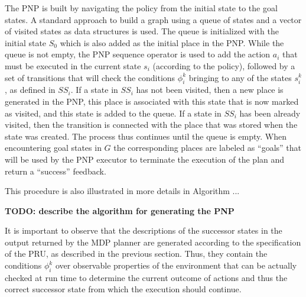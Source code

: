 The PNP is built by navigating the policy from the initial state to the goal states.
A standard approach to build a graph using a queue of states and a vector of visited states as data structures is used.
The queue is initialized with the initial state $S_0$ which is also added as the initial place in the PNP.
While the queue is not empty, the PNP sequence operator is used to add the action $a_i$ that must be executed in the current state $s_i$ (according to the policy), followed by a set of transitions that will check the conditions $\phi_i^k$ bringing to any of the states $s_i^k$, as defined in $SS_i$. 
If a state in $SS_i$ has not been visited, then a new place is generated in the PNP, this place is associated with this state that is now marked as visited, and this state is added to the queue. If a state in $SS_i$ has been already visited, then the transition is connected with the place that was stored when the state was created. The process thus continues until the queue is empty.
When encountering goal states in $G$ the corresponding places are labeled as ``goals'' that will be used by the PNP executor to terminate the execution of the plan and return a ``success'' feedback.


This procedure is also illustrated in more details in Algorithm ... 

{\bf TODO: describe the algorithm for generating the PNP}

It is important to observe that the descriptions of the successor states in the output returned by the MDP planner are generated according to the specification of the PRU, as described in the previous section. Thus, they contain the conditions $\phi_i^k$ over observable properties of the environment that can be actually checked at run time to determine the current outcome of actions and thus the correct successor state from which the execution should continue.


